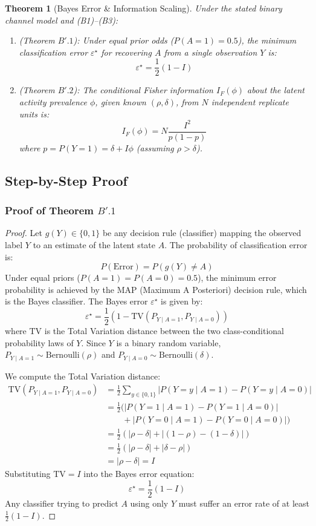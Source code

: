 \documentclass[11pt,a4paper]{article}
\newtheorem{theorem}{Theorem}
\begin{document}
\begin{theorem}[Bayes Error \& Information Scaling]
Under the stated binary channel model and (B1)--(B3):
\begin{enumerate}
    \item (Theorem $B'.1$): Under equal prior odds ($P(A=1) = 0.5$), the minimum classification error $\varepsilon^\star$ for recovering $A$ from a single observation $Y$ is:
    \[
    \varepsilon^\star = \frac{1}{2}(1 - I)
    \]
    \item (Theorem $B'.2$): The conditional Fisher information $I_F(\phi)$ about the latent activity prevalence $\phi$, given known $(\rho, \delta)$, from $N$ independent replicate units is: %
    \[
    I_F(\phi) = N \frac{I^2}{p(1-p)}
    \]
    where $p = P(Y=1) = \delta + I\phi$ (assuming $\rho > \delta$).
\end{enumerate}
\end{theorem}

\subsection{Step-by-Step Proof}

\subsubsection{Proof of Theorem $B'.1$}
\begin{proof}
Let $g(Y) \in \{0, 1\}$ be any decision rule (classifier) mapping the observed label $Y$ to an estimate of the latent state $A$. The probability of classification error is:
\[
P(\text{Error}) = P(g(Y) \neq A)
\]
Under equal priors ($P(A=1) = P(A=0) = 0.5$), the minimum error probability is achieved by the MAP (Maximum A Posteriori) decision rule, which is the Bayes classifier. The Bayes error $\varepsilon^\star$ is given by:
\[
\varepsilon^\star = \frac{1}{2} \left( 1 - \text{TV}(P_{Y \mid A=1}, P_{Y \mid A=0}) \right)
\]
where $\text{TV}$ is the Total Variation distance between the two class-conditional probability laws of $Y$. Since $Y$ is a binary random variable, $P_{Y \mid A=1} \sim \text{Bernoulli}(\rho)$ and $P_{Y \mid A=0} \sim \text{Bernoulli}(\delta)$. 

We compute the Total Variation distance:
\begin{align*}
    \text{TV}(P_{Y \mid A=1}, P_{Y \mid A=0}) &= \frac{1}{2} \sum_{y \in \{0, 1\}} |P(Y=y \mid A=1) - P(Y=y \mid A=0)| \\
    &= \frac{1}{2} \Big( |P(Y=1 \mid A=1) - P(Y=1 \mid A=0)| \\
    &\quad\quad + |P(Y=0 \mid A=1) - P(Y=0 \mid A=0)| \Big) \\
    &= \frac{1}{2} \left( |\rho - \delta| + |(1 - \rho) - (1 - \delta)| \right) \\
    &= \frac{1}{2} \left( |\rho - \delta| + |\delta - \rho| \right) \\
    &= |\rho - \delta| = I
\end{align*}
Substituting $\text{TV} = I$ into the Bayes error equation:
\[
\varepsilon^\star = \frac{1}{2}(1 - I)
\]
Any classifier trying to predict $A$ using only $Y$ must suffer an error rate of at least $\frac{1}{2}(1 - I)$.
\end{proof}
\end{document}
